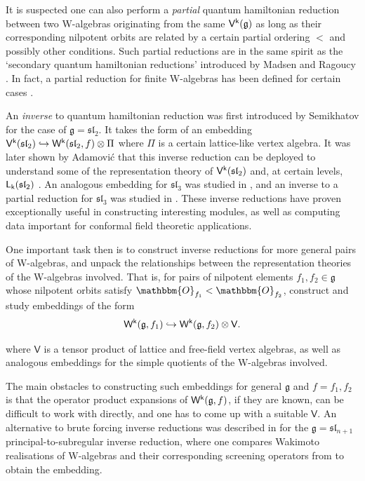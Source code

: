 \documentclass[10pt,a4paper]{amsart}
\numberwithin{equation}{section}
\newcommand{\kk}{\mathsf{k}}   %
\DeclarePairedDelimiter{\brac}{\lparen}{\rparen}   %
\newcommand{\alg}[1]{\mathfrak{#1}}  %
\newcommand{\VOA}[1]{\mathsf{#1}}    %
\newcommand{\SLA}[2]{\alg{#1}_{#2}}                      %
\newcommand{\sltwo}{\SLA{sl}{2}}
\newcommand{\slthree}{\SLA{sl}{3}}
\newcommand{\slnpone}{\SLA{sl}{n+1}}
\newcommand{\nilorbit}[1]{\mathbbm{O}_{#1}}                                                 %
\newcommand{\Wsymb}{\VOA{W}}
\newcommand{\uaffvoa}[2]{\VOA{V}^{#1}\brac{#2}}                   %
\newcommand{\saffvoa}[2]{\VOA{L}_{#1}\brac{#2}}                   %
\newcommand{\halflattice}{\Pi}                          		  %
\newcommand{\uQHR}[3]{\Wsymb^{#1}\brac{#2,#3}}                    %
\theoremstyle{plain}
\begin{document}
 It is suspected one can also perform a \emph{partial} quantum hamiltonian reduction between two W-algebras originating from the same $\uaffvoa{\kk}{\mathfrak{g}}$ as long as their corresponding nilpotent orbits are related by a certain partial ordering $<$ \cite{Collingwood17} and possibly other conditions. Such partial reductions are in the same spirit as the `secondary quantum hamiltonian reductions' introduced by Madsen and Ragoucy \cite{RagSecond97}. In fact, a partial reduction for finite W-algebras has been defined for certain cases \cite{MorQua15, GenStage22}.

An \emph{inverse} to quantum hamiltonian reduction was first introduced by Semikhatov \cite{SemInv94} for the case of $\mathfrak{g}=\sltwo$. It takes the form of an embedding $\uaffvoa{\kk}{\sltwo} \hookrightarrow \uQHR{\kk}{\sltwo}{f} \otimes \halflattice$ where $\halflattice$ is a certain lattice-like vertex algebra. It was later shown by Adamovi\'c that this inverse reduction can be deployed to understand some of the representation theory of $\uaffvoa{\kk}{\sltwo}$ and, at certain levels, $\saffvoa{\kk}{\sltwo}$ \cite{AdaRea17}. An analogous embedding for $\slthree$ was studied in \cite{ACG21}, and an inverse to a partial reduction for $\slthree$ was studied in \cite{AdaRea20,Feh21b, AdaWeight23}. These inverse reductions have proven exceptionally useful in constructing interesting modules, as well as computing data important for conformal field theoretic applications.

One important task then is to construct inverse reductions for more general pairs of W-algebras, and unpack the relationships between the representation theories of the W-algebras involved. That is, for pairs of nilpotent elements $f_1, f_2 \in \mathfrak{g}$ whose nilpotent orbits satisfy $\nilorbit{f_1}<\nilorbit{f_2}$, construct and study embeddings of the form
%
\begin{equation}
    \uQHR{\kk}{\mathfrak{g}}{f_1} \hookrightarrow \uQHR{\kk}{\mathfrak{g}}{f_2} \otimes \VOA{V}.
\end{equation}

where $\VOA{V}$ is a tensor product of lattice and free-field vertex algebras, as well as analogous embeddings for the simple quotients of the W-algebras involved.

The main obstacles to constructing such embeddings for general $\mathfrak{g}$ and $f=f_1, f_2$ is that the operator product expansions of $\uQHR{\kk}{\mathfrak{g}}{f}$, if they are known, can be difficult to work with directly, and one has to come up with a suitable $\VOA{V}$. An alternative to brute forcing inverse reductions was described in \cite{Feh21c} for the $\mathfrak{g}=\slnpone$ principal-to-subregular inverse reduction, where one compares Wakimoto realisations of W-algebras and their corresponding screening operators from \cite{GenScreen20} to obtain the embedding.
\end{document}
